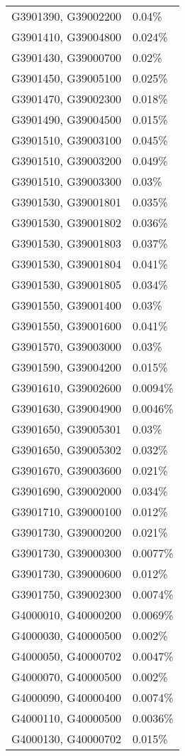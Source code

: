 \begin{longtable}[]{@{}ll@{}}
G3901390, G39002200 & 0.04\% \\
G3901410, G39004800 & 0.024\% \\
G3901430, G39000700 & 0.02\% \\
G3901450, G39005100 & 0.025\% \\
G3901470, G39002300 & 0.018\% \\
G3901490, G39004500 & 0.015\% \\
G3901510, G39003100 & 0.045\% \\
G3901510, G39003200 & 0.049\% \\
G3901510, G39003300 & 0.03\% \\
G3901530, G39001801 & 0.035\% \\
G3901530, G39001802 & 0.036\% \\
G3901530, G39001803 & 0.037\% \\
G3901530, G39001804 & 0.041\% \\
G3901530, G39001805 & 0.034\% \\
G3901550, G39001400 & 0.03\% \\
G3901550, G39001600 & 0.041\% \\
G3901570, G39003000 & 0.03\% \\
G3901590, G39004200 & 0.015\% \\
G3901610, G39002600 & 0.0094\% \\
G3901630, G39004900 & 0.0046\% \\
G3901650, G39005301 & 0.03\% \\
G3901650, G39005302 & 0.032\% \\
G3901670, G39003600 & 0.021\% \\
G3901690, G39002000 & 0.034\% \\
G3901710, G39000100 & 0.012\% \\
G3901730, G39000200 & 0.021\% \\
G3901730, G39000300 & 0.0077\% \\
G3901730, G39000600 & 0.012\% \\
G3901750, G39002300 & 0.0074\% \\
G4000010, G40000200 & 0.0069\% \\
G4000030, G40000500 & 0.002\% \\
G4000050, G40000702 & 0.0047\% \\
G4000070, G40000500 & 0.002\% \\
G4000090, G40000400 & 0.0074\% \\
G4000110, G40000500 & 0.0036\% \\
G4000130, G40000702 & 0.015\% \\

\end{longtable}
